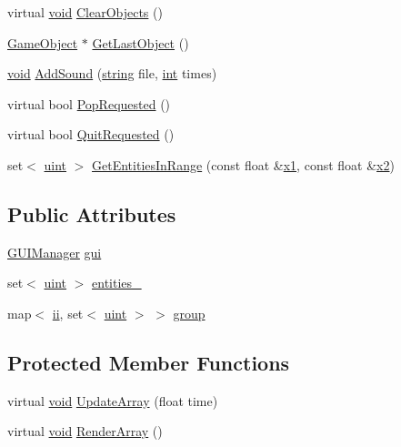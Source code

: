 \begin{DoxyCompactItemize}
\item 
virtual \hyperlink{_s_d_l__opengles2__gl2ext_8h_ae5d8fa23ad07c48bb609509eae494c95}{void} \hyperlink{class_state_a682fd5c0e402a6d7f8f480aa7356d047}{Clear\-Objects} ()
\item 
\hyperlink{class_game_object}{Game\-Object} $\ast$ \hyperlink{class_state_ab70325f4e708fd6375520c750a02e10b}{Get\-Last\-Object} ()
\item 
\hyperlink{_s_d_l__opengles2__gl2ext_8h_ae5d8fa23ad07c48bb609509eae494c95}{void} \hyperlink{class_state_ac73857c4657768f19d2114ef4041549c}{Add\-Sound} (\hyperlink{_s_d_l__opengl__glext_8h_ae84541b4f3d8e1ea24ec0f466a8c568b}{string} file, \hyperlink{_s_d_l__thread_8h_a6a64f9be4433e4de6e2f2f548cf3c08e}{int} times)
\item 
virtual bool \hyperlink{class_state_a3ce3e5d9230192eaab672349e5937a09}{Pop\-Requested} ()
\item 
virtual bool \hyperlink{class_state_a75cebfa3285922a359d5f946c138d129}{Quit\-Requested} ()
\item 
set$<$ \hyperlink{common_8hpp_a69aa29b598b851b0640aa225a9e5d61d}{uint} $>$ \hyperlink{class_state_aa43c296bed2a9cf771cde8b0877c0c86}{Get\-Entities\-In\-Range} (const float \&\hyperlink{_s_d_l__opengl__glext_8h_a49825216c96caaeb09237b36651181c5}{x1}, const float \&\hyperlink{_s_d_l__opengl__glext_8h_a7b907a03236685c534d89d604cff23c8}{x2})
\end{DoxyCompactItemize}
\subsection*{Public Attributes}
\begin{DoxyCompactItemize}
\item 
\hyperlink{class_g_u_i_manager}{G\-U\-I\-Manager} \hyperlink{class_state_aca632a80920808dc1aad399ec560f84f}{gui}
\item 
set$<$ \hyperlink{common_8hpp_a69aa29b598b851b0640aa225a9e5d61d}{uint} $>$ \hyperlink{class_state_a19fc3c4e3d962de483ca940be49cd113}{entities\-\_\-}
\item 
map$<$ \hyperlink{common_8hpp_a45680061f7e655744e42cdfa30b44fa8}{ii}, set$<$ \hyperlink{common_8hpp_a69aa29b598b851b0640aa225a9e5d61d}{uint} $>$ $>$ \hyperlink{class_state_a18dfb560751c969cf8d6583b55fa2885}{group}
\end{DoxyCompactItemize}
\subsection*{Protected Member Functions}
\begin{DoxyCompactItemize}
\item 
virtual \hyperlink{_s_d_l__opengles2__gl2ext_8h_ae5d8fa23ad07c48bb609509eae494c95}{void} \hyperlink{class_state_a23287331ba19c3a06e49b5c77bc7bfc5}{Update\-Array} (float time)
\item 
virtual \hyperlink{_s_d_l__opengles2__gl2ext_8h_ae5d8fa23ad07c48bb609509eae494c95}{void} \hyperlink{class_state_aaaad11346a36120afd9c4049f0fa1798}{Render\-Array} ()
\end{DoxyCompactItemize}

